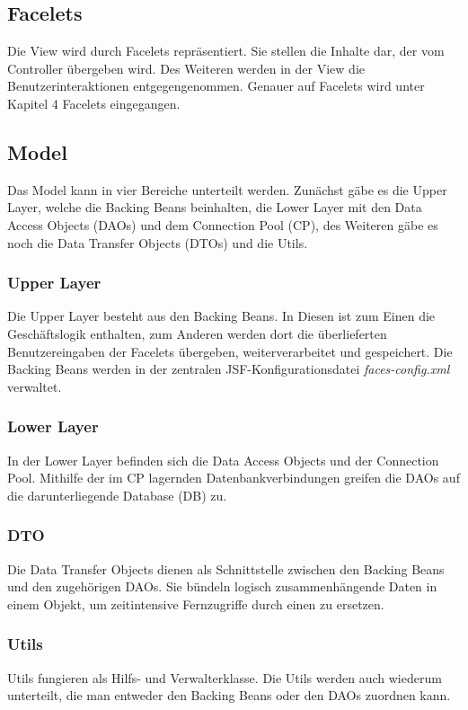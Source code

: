     \subsection{Facelets}
    	Die View wird durch Facelets repräsentiert. Sie stellen die Inhalte dar, der vom Controller übergeben wird. Des Weiteren werden in der View die Benutzerinteraktionen entgegengenommen. Genauer auf Facelets wird unter Kapitel 4 Facelets eingegangen.
   	\subsection{Model}
   	Das Model kann in vier Bereiche unterteilt werden. Zunächst gäbe es die \glqq Upper Layer\grqq{}, welche die Backing Beans beinhalten, die \glqq Lower Layer\grqq{} mit den Data Access Objects (DAOs) und dem Connection Pool (CP), des Weiteren gäbe es noch die Data Transfer Objects (DTOs) und die Utils. 
   		\subsubsection{Upper Layer}
   		Die \glqq Upper Layer\grqq{} besteht aus den Backing Beans. In Diesen ist zum Einen die Geschäftslogik enthalten, zum Anderen werden dort die überlieferten Benutzereingaben der Facelets übergeben, weiterverarbeitet und gespeichert. Die Backing Beans werden in der zentralen JSF-Konfigurationsdatei \textit{faces-config.xml} verwaltet.
    	\subsubsection{Lower Layer}
    	In der \glqq Lower Layer\grqq{} befinden sich die Data Access Objects und der Connection Pool. Mithilfe der im CP lagernden Datenbankverbindungen greifen die DAOs auf die darunterliegende Database (DB) zu.
    	\subsubsection{DTO}
    	Die Data Transfer Objects dienen als Schnittstelle zwischen den Backing Beans und den zugehörigen DAOs. Sie bündeln logisch zusammenhängende Daten in einem Objekt, um zeitintensive Fernzugriffe durch einen zu ersetzen.
    	\subsubsection{Utils}
    	Utils fungieren als Hilfs- und Verwalterklasse. Die Utils werden auch wiederum unterteilt, die man entweder den Backing Beans oder den DAOs zuordnen kann. 
